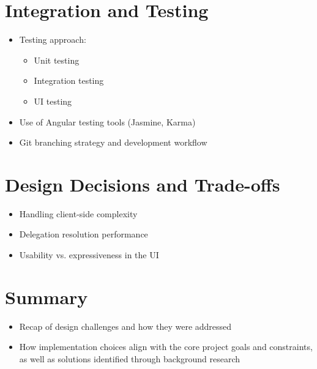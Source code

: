 \section{Integration and Testing}
\begin{itemize}
  \item Testing approach:
  \begin{itemize}
    \item Unit testing
    \item Integration testing
    \item UI testing
  \end{itemize}
  \item Use of Angular testing tools (Jasmine, Karma)
  \item Git branching strategy and development workflow
\end{itemize}

\section{Design Decisions and Trade-offs}
\begin{itemize}
  \item Handling client-side complexity
  \item Delegation resolution performance
  \item Usability vs. expressiveness in the UI
\end{itemize}

\section{Summary}
\begin{itemize}
  \item Recap of design challenges and how they were addressed
  \item How implementation choices align with the core project goals and constraints, as well as solutions identified through background research
\end{itemize}


